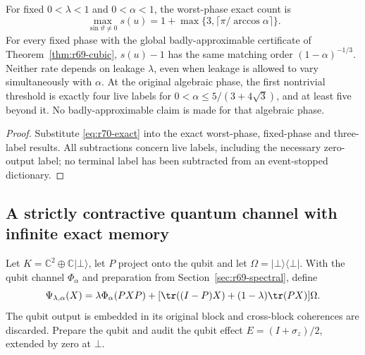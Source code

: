 \begin{corollary}\label{cor:r70-rates}
For fixed $0<\lambda<1$ and $0<\alpha<1$, the worst-phase exact count is
\[
 \max_{\sin\vartheta\ne0}s(u)
 =1+\max\{3,\lceil\pi/\arccos\alpha\rceil\}.
\]
For every fixed phase with the global badly-approximable certificate of Theorem~\ref{thm:r69-cubic}, $s(u)-1$ has the same matching order $(1-\alpha)^{-1/3}$. Neither rate depends on leakage $\lambda$, even when leakage is allowed to vary simultaneously with $\alpha$. At the original algebraic phase, the first nontrivial threshold is exactly four live labels for $0<\alpha\le5/(3+4\sqrt3)$, and at least five beyond it. No badly-approximable claim is made for that algebraic phase.
\end{corollary}
\begin{proof}
Substitute \eqref{eq:r70-exact} into the exact worst-phase, fixed-phase and three-label results. All subtractions concern live labels, including the necessary zero-output label; no terminal label has been subtracted from an event-stopped dictionary.
\end{proof}

\subsection{A strictly contractive quantum channel with infinite exact memory}
Let $K=\mathbb C^2\oplus\mathbb C|\bot\rangle$, let $P$ project onto the qubit and let $\Omega=|\bot\rangle\langle\bot|$. With the qubit channel $\Phi_\alpha$ and preparation from Section~\ref{sec:r69-spectral}, define
\begin{equation}\label{eq:r70-channel}
 \Psi_{\lambda,\alpha}(X)
 =\lambda\Phi_\alpha(PXP)
  +[\tr((I-P)X)+(1-\lambda)\tr(PX)]\Omega.
\end{equation}
The qubit output is embedded in its original block and cross-block coherences are discarded. Prepare the qubit and audit the qubit effect $E=(I+\sigma_z)/2$, extended by zero at $\bot$.

